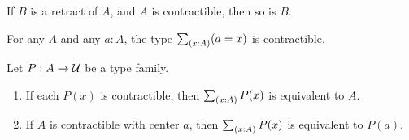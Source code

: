 \documentclass[hott-all.tex]{subfiles}
\begin{document}
\begin{lem}\label{thm:retract-contr}
  If $B$ is a retract of $A$, and $A$ is contractible, then so is $B$.
\end{lem}
%


\begin{lem}\label{thm:contr-paths}
  For any $A$ and any $a:A$, the type $\sm{x:A} (a=x)$ is contractible.
\end{lem}
%

\begin{lem}\label{thm:omit-contr}
  Let $P:A\to\mathcal{U}$ be a type family.
  \begin{enumerate}
  \item If each $P(x)$ is contractible, then $\sm{x:A} P(x)$ is equivalent to $A$.\label{item:omitcontr1}
  \item If $A$ is contractible with center $a$, then $\sm{x:A} P(x)$ is equivalent to $P(a)$.\label{item:omitcontr2}
  \end{enumerate}
\end{lem}
%
\end{document}
